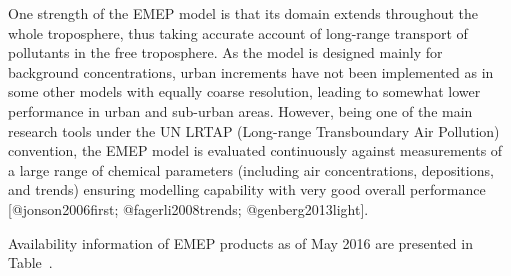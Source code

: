 \documentclass[9pt]{report}
\begin{document}
One strength of the EMEP model is that its domain extends throughout the whole troposphere, thus taking accurate account of long-range transport of pollutants in the free troposphere.
As the model is designed mainly for background concentrations, urban increments have not been implemented as in some other models with equally coarse resolution, leading to somewhat lower performance in urban and sub-urban areas.
However, being one of the main research tools under the UN LRTAP (Long-range Transboundary Air Pollution) convention, the EMEP model is evaluated continuously against measurements of a large range of chemical parameters (including air concentrations, depositions, and trends) ensuring modelling capability with very good overall performance [@jonson2006first; @fagerli2008trends; @genberg2013light].%

Availability information of EMEP products as of May 2016 are presented in Table~.%

\begin{table}[h!]%
\begin{mdcenter}%
{}%
\end{mdcenter}\label{emep-portfolio}%
\end{table}%
\end{document}

